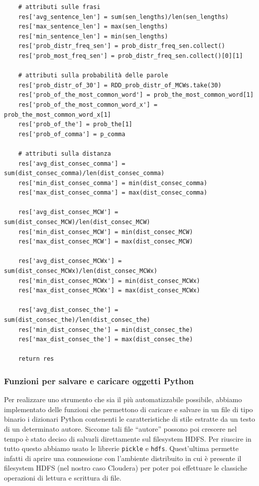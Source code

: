 \documentclass[titlepage]{article}
\begin{document}
\begin{verbatim}
    # attributi sulle frasi
    res['avg_sentence_len'] = sum(sen_lengths)/len(sen_lengths)
    res['max_sentence_len'] = max(sen_lengths)
    res['min_sentence_len'] = min(sen_lengths)
    res['prob_distr_freq_sen'] = prob_distr_freq_sen.collect()
    res['prob_most_freq_sen'] = prob_distr_freq_sen.collect()[0][1]
    
    # attributi sulla probabilità delle parole
    res['prob_distr_of_30'] = RDD_prob_distr_of_MCWs.take(30)
    res['prob_of_the_most_common_word'] = prob_the_most_common_word[1]
    res['prob_of_the_most_common_word_x'] = prob_the_most_common_word_x[1]
    res['prob_of_the'] = prob_the[1]
    res['prob_of_comma'] = p_comma
    
    # attributi sulla distanza
    res['avg_dist_consec_comma'] = sum(dist_consec_comma)/len(dist_consec_comma)
    res['min_dist_consec_comma'] = min(dist_consec_comma)
    res['max_dist_consec_comma'] = max(dist_consec_comma)
    
    res['avg_dist_consec_MCW'] = sum(dist_consec_MCW)/len(dist_consec_MCW)
    res['min_dist_consec_MCW'] = min(dist_consec_MCW)
    res['max_dist_consec_MCW'] = max(dist_consec_MCW)
    
    res['avg_dist_consec_MCWx'] = sum(dist_consec_MCWx)/len(dist_consec_MCWx)
    res['min_dist_consec_MCWx'] = min(dist_consec_MCWx)
    res['max_dist_consec_MCWx'] = max(dist_consec_MCWx)
    
    res['avg_dist_consec_the'] = sum(dist_consec_the)/len(dist_consec_the)
    res['min_dist_consec_the'] = min(dist_consec_the)
    res['max_dist_consec_the'] = max(dist_consec_the)
    
    return res
\end{verbatim}

\subsubsection{Funzioni per salvare e caricare oggetti Python}
Per realizzare uno strumento che sia il più automatizzabile possibile, abbiamo implementato delle funzioni che permettono di caricare e salvare in un file di tipo binario i dizionari Python contenenti le caratteristiche di stile estratte da un testo di un determinato autore. Siccome tali file ``autore'' possono poi crescere nel tempo è stato deciso di salvarli direttamente sul filesystem HDFS. Per riuscire in tutto questo abbiamo usato le librerie \texttt{pickle} e \texttt{hdfs}. Quest'ultima permette infatti di aprire una connessione con l'ambiente distribuito in cui è presente il filesystem HDFS (nel nostro caso Cloudera) per poter poi effettuare le classiche operazioni di lettura e scrittura di file.
\end{document}
